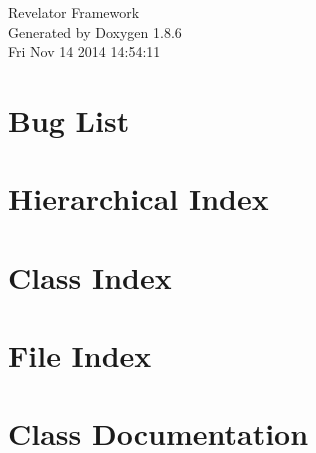 \documentclass[twoside]{book}
\newcommand{\clearemptydoublepage}{%
  \newpage{\pagestyle{empty}\cleardoublepage}%
}
\begin{document}
\hypersetup{pageanchor=false}
\begin{titlepage}
\vspace*{7cm}
\begin{center}%
{\Large Revelator Framework }\\
\vspace*{1cm}
{\large Generated by Doxygen 1.8.6}\\
\vspace*{0.5cm}
{\small Fri Nov 14 2014 14:54:11}\\
\end{center}
\end{titlepage}
\clearemptydoublepage
\tableofcontents
\clearemptydoublepage
{}
\hypersetup{pageanchor=true}

\chapter{Bug List}
\label{bug}
\hypertarget{bug}{}

\chapter{Hierarchical Index}

\chapter{Class Index}

\chapter{File Index}

\chapter{Class Documentation}

































\end{document}

